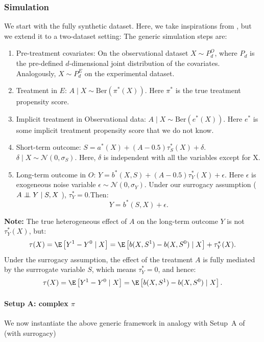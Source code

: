 \documentclass{article} %
\theoremstyle{plain} %
\theoremstyle{definition} %
\theoremstyle{remark} %
\newcommand{\indep}{\mathrel{\perp\mspace{-10mu}\perp}} %
\begin{document}
\subsubsection{Simulation}
We start with the fully synthetic dataset. Here, we take inspirations from \citet{Nie.2021}, but we extend it to a two-dataset setting: The generic simulation steps are:
\begin{enumerate}
    \item Pre-treatment covariates: On the observational dataset $X\sim P_d^O$, where $P_d$ is the pre-defined $d$-dimensional joint distribution of the covariates. Analogously, $X \sim P_d^E$ on the experimental dataset.
    \item Treatment in $E$: $A\mid X \sim \text{Ber}(\pi^*(X))$. Here $\pi^*$ is the true treatment propensity score.
    \item Implicit treatment in Observational data: $A\mid X \sim \text{Ber}(e^*(X))$. Here $e^*$ is some implicit treatment propensity score that we do not know.
    \item Short-term outcome: $S =  a^*(X) + (A-0.5)\tau^*_S(X) + \delta$. $\delta \mid X \sim \mathcal{N}(0, \sigma_S)$. Here, $\delta$ is independent with all the variables except for X.
    \item Long-term outcome in $O$: $Y = b^*(X,S) + (A - 0.5)\tau^*_Y(X) + \epsilon$. Here $\epsilon$ is exogeneous noise variable $\epsilon \sim \mathcal{N}(0, \sigma_Y)$. Under our surrogacy assumption ($A \indep Y \mid S, X$ ), $\tau_Y^* = 0$.Then:
    \begin{equation}
        Y = b^*(S,X) + \epsilon.
    \end{equation}
\end{enumerate}
\textbf{Note:} The true heterogeneous effect of $A$ on the long-term outcome $Y$ is not $\tau_Y^*(X)$, but:
\begin{equation}
\label{eq:true-cate-simulation}
    \tau(X)=\E \left[Y^1-Y^0\mid X\right] = \E\left[b(X,S^1) - b(X, S^0) \mid X \right] + \tau_Y^*(X).
\end{equation}
Under the surrogacy assumption, the effect of the treatment $A$ is fully mediated by the surrrogate variable $S$, which means $\tau_Y^*=0$, and hence:
\begin{equation}
\label{eq:true-cate-surr-simulation}
    \tau(X)=\E \left[Y^1-Y^0\mid X\right] = \E\left[b(X,S^1) - b(X, S^0)\mid X \right].
\end{equation}

\paragraph{Setup A: complex $\pi$}
We now instantiate the above generic framework in analogy with Setup~A of \citet{Nie.2021} (with surrogacy)
\end{document}
